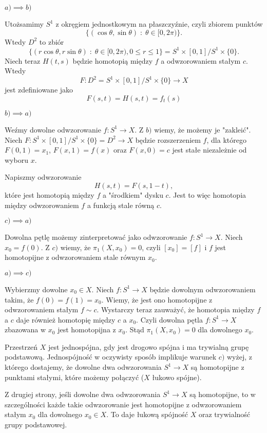\begin{solution}
  $a)\implies b)$

  Utożsamimy $S^1$ z okręgiem jednostkowym na płaszczyźnie, czyli zbiorem punktów 
  $$\{(\cos\theta, \sin\theta)\;:\;\theta\in[0,2\pi)\}.$$
  Wtedy $D^2$ to zbiór
  $$\{(r\cos\theta, r\sin\theta)\;:\;\theta\in[0,2\pi), 0\leq r\leq 1\}=S^1\times [0,1]/ S^1\times\{0\}.$$
  Niech teraz $H(t, s)$ będzie homotopią między $f$ a odwzorowaniem stałym $c$. Wtedy
  $$F:D^2=S^1\times[0,1]/S^1\times\{0\}\to X$$
  jest zdefiniowane jako 
  $$F(s, t)=H(s, t)=f_t(s)$$

  $b)\implies a)$

  Weźmy dowolne odwzorowanie $f:S^1\to X$. Z $b)$ wiemy, że możemy je "zakleić". Niech $F:S^1\times [0,1]/S^1\times\{0\}=D^2\to X$ będzie rozszerzeniem $f$, dla którego $F(0,1)=x_1$, $F(x, 1)=f(x)$ oraz $F(x, 0)=c$ jest stałe niezależnie od wyboru $x$. 

  Napiszmy odwzorowanie 
  $$H(s, t)=F(s, 1-t),$$
  które jest homotopią między $f$ a "środkiem" dysku $c$. Jest to więc homotopia między odwzorowaniem $f$ a funkcją stale równą $c$.

  $c)\implies a)$

  Dowolna pętlę możemy zinterpretować jako odwzorowanie $f:S^1\to X$. Niech $x_0=f(0)$. Z $c)$ wiemy, że $\pi_1(X, x_0)=0$, czyli $[x_0]=[f]$ i $f$ jest homotopijne z odwzorowaniem stale równym $x_0$.

  $a)\implies c)$

  Wybierzmy dowolne $x_0\in X$. Niech $f:S^1\to X$ będzie dowolnym odwzorowaniem takim, że $f(0)=f(1)=x_0$. Wiemy, że jest ono homotopijne z odwzorowaniem stałym $f\sim c$. Wystarczy teraz zauważyć, że homotopia między $f$ a $c$ daje również homotopię między $c$ a $x_0$. Czyli dowolna pętla $f:S^1\to X$ zbazowana w $x_0$ jest homotopijna z $x_0$. Stąd $\pi_1(X, x_0)=0$ dla dowolnego $x_0$.

  \begin{center}
  \end{center}

  Przestrzeń $X$ jest jednospójna, gdy jest drogowo spójna i ma trywialną grupę podstawową. Jednospójność w oczywisty sposób implikuje warunek $c)$ wyżej, z którego dostajemy, że dowolne dwa odwzorowania $S^1\to X$ są homotopijne z punktami stałymi, które możemy połączyć ($X$ łukowo spójne). 

  Z drugiej strony, jeśli dowolne dwa odwzorowania $S^1\to X$ są homotopijne, to w szczególności każde takie odwzorowanie jest homotopijne z odwzorowaniem stałym $x_0$ dla dowolnego $x_0\in X$. To daje łukową spójność $X$ oraz trywialność grupy podstawowej.
\end{solution}

